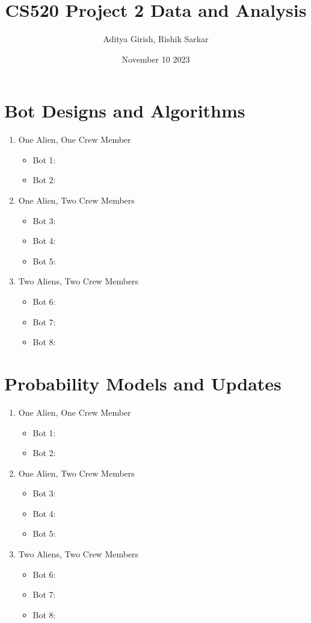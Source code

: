 \documentclass[11pt]{article}
\title{CS520 Project 2 Data and Analysis}
\author{Aditya Girish, Rishik Sarkar}
\date{November 10 2023}
\begin{document}
\maketitle

\section{Bot Designs and Algorithms}

\begin{enumerate}
    \item One Alien, One Crew Member
    \begin{itemize}
        \item Bot 1:
        \item Bot 2:
    \end{itemize}
    \item One Alien, Two Crew Members
    \begin{itemize}
        \item Bot 3:
        \item Bot 4:
        \item Bot 5:
    \end{itemize}
    \item Two Aliens, Two Crew Members
    \begin{itemize}
        \item Bot 6:
        \item Bot 7:
        \item Bot 8:
    \end{itemize}
\end{enumerate}

\section{Probability Models and Updates}

\begin{enumerate}
    \item One Alien, One Crew Member
    \begin{itemize}
        \item Bot 1:
        \item Bot 2:
    \end{itemize}
    \item One Alien, Two Crew Members
    \begin{itemize}
        \item Bot 3:
        \item Bot 4:
        \item Bot 5:
    \end{itemize}
    \item Two Aliens, Two Crew Members
    \begin{itemize}
        \item Bot 6:
        \item Bot 7:
        \item Bot 8:
    \end{itemize}
\end{enumerate}
\end{document}
